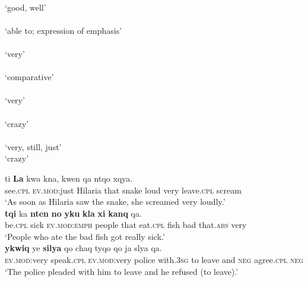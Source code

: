 \documentclass[output=paper]{langsci/langscibook}
\begin{document}
\begin{exe}

	\ex\label{ex:CruzStump:19}

	 \\  {`good, well'} \\
	 \\  {`able to; expression of emphasis'}\\
\largerpage
	 \\  {`very'} \\
	 \\  {`comparative'}\\
	 \\  {`very'} \\
	 \\  {`crazy'}\\
\newpage 	 
	 \\  {`very, still, just' }
	 \\  {`crazy'}\\
	 \z


	\ex\label{ex:CruzStump:20}
	 {{ti}} { \textbf{{La}}} {{kwa} } {{kna},} {{kwen}  } {{qa} } {{ntqo} } { {xqya}.}\\
	 {see.\textsc{cpl}} {\textsc{ev.mod}:just} {Hilaria} {that} {snake} {loud} {very} {leave.\textsc{cpl}} {scream}\\
	\glt `As soon as Hilaria saw the snake, she screamed very loudly.'\\


	\ex\label{ex:CruzStump:21}
	 { \textbf{{tqi}} } {  {ka}  } { \textbf{{nten}} } {  \textbf{{no}}  } { \textbf{{yku}}  } { \textbf{{kla}}  } { \textbf{{xi}}  } { \textbf{{kanq}} } {{qa}.}\\
	 {be.\textsc{cpl} } { sick } { \textsc{ev.mod:emph} } { people } { that } { eat.\textsc{cpl} } { fish } { bad } { that.\textsc{abs} } {very}\\
	\glt `People who ate the bad fish got really sick.'\\



	\ex\label{ex:CruzStump:22}
	 { \textbf{{ykwiq}}  } { {ye} } {  \textbf{{silya}} } { {qo} } {{chaq}} {{tyqo}} {qo}  {{ ja}  } { {slya}}  { {qa}. } \\
	 {\textsc{ev.mod}:very } { speak.\textsc{cpl} } { \textsc{ev.mod}:very } { police } { with.\textsc{3sg} } { to } {leave} {and}  { \textsc{neg} } { agree.\textsc{cpl} } { \textsc{neg} }\\
	 \glt `The police pleaded with him to leave and he refused (to leave).'\\



\end{exe}
\end{document}
